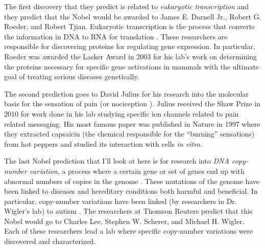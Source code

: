\documentclass[12pt]{article}
\begin{document}
The first discovery that they predict is related to \emph{eukaryotic
transcription} and they predict that the Nobel would be awarded to James E.
Darnell Jr., Robert G. Roeder, and Robert Tjian.
Eukaryotic transcription is the process that converts the information in DNA
to RNA for translation \cite{eukaryotic}.
These researchers are responsible for discovering proteins for regulating gene
expression.
In particular, Roeder was awarded the Lasker Award in 2003 \cite{lasker} for
his lab's work on determining the proteins necessary for specific gene
activations in mammals with the ultimate goal of treating serious diseases
genetically.

The second prediction goes to David Julius for his research into the molecular
basis for the sensation of pain (or nociception \cite{nociception}).
Julius received the Shaw Prize in 2010 for work done in his lab studying
specific ion channels related to pain related messaging.
His most famous paper was published in Nature in 1997 \cite{julius} where they
extracted capsaicin (the chemical responsible for the ``burning'' sensations)
from hot peppers and studied its interaction with cells \emph{in vitro}.

The last Nobel prediction that I'll look at here is for research into
\emph{DNA copy-number variation}, a process where a certain gene or set of
genes end up with abnormal numbers of copies in the genome \cite{cnv}.
These mutations of the genome have been linked to diseases and hereditary
conditions both harmful and beneficial.
In particular, copy-number variations have been linked (by researchers in Dr.
Wigler's lab) to autism \cite{novo}.
The researchers at Thomson Reuters predict that this Nobel would go to Charles
Lee, Stephen W. Scherer, and Michael H. Wigler.
Each of these researchers lead a lab where specific copy-number variations
were discovered and characterized.



{}

\end{document}
